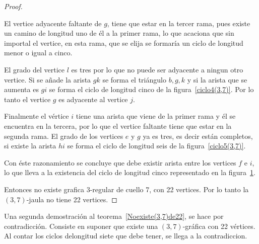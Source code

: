 \documentclass[12pt]{book}
\theoremstyle{definition}
\begin{document}
\begin{proof}
\begin{figure}
\caption{} \label{ciclo6(3,7)}
\end{figure}


El vertice adyacente faltante de $g$, tiene que estar en la tercer
rama, pues existe un camino de longitud uno de él a la primer rama, lo
que acaciona que sin importal el vertice, en esta rama, que se elija
se formaría un ciclo de longitud menor o igual a cinco.

El grado del vertice $l$ es tres por lo que no puede ser adyacente a
ningun otro vertice. Si se añade la arista $gk$ se forma el triángulo
$b,g,k$ y si la arista que se aumenta es $gi$ se forma el ciclo de
longitud cinco de la
figura~\ref{ciclo4(3,7)}. Por lo tanto el vertice $g$ es adyacente al
vertice $j$.


Finalmente el vértice $i$ tiene una arista que viene de la primer rama
y él se encuentra en la tercera, por lo que el vertice faltante tiene
que estar en la segunda
rama. El grado de los vertices $e$ y $g$ ya es tres, es decir están
completos, si existe la arista $hi$ se forma el ciclo de
longitud seis de la figura~\ref{ciclo5(3,7)}.


Con éste razonamiento se concluye que debe existir arista entre los
vertices $f$ e $i$, lo que lleva a la existencia del ciclo de longitud cinco
representado en la figura~\ref{ciclo6(3,7)}. 

Entonces no existe grafica $3$-regular de cuello 7, con 22
vertices. Por lo tanto la $(3,7)$-jaula no tiene 22 vertices.



\end{proof}


Una segunda demostración al teorema~\ref{Noexiste(3,7)de22},
se hace por contradicción. Consiste en suponer que existe una $(3,7)$-gráfica con 22 vértices. Al contar los ciclos delongitud siete que debe tener, se llega a la contradiccion.
\end{document}
